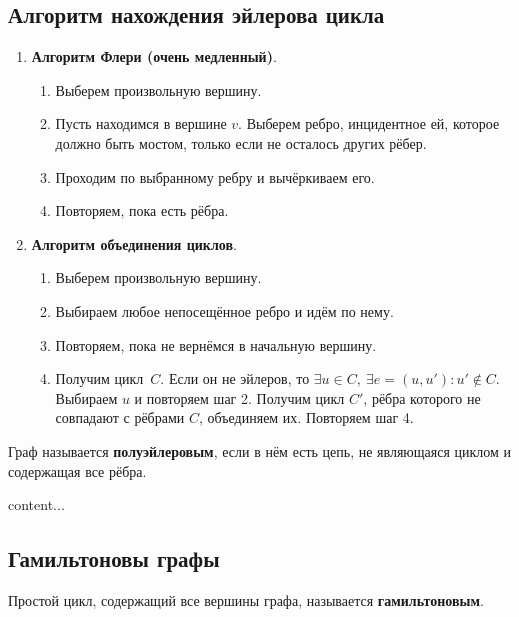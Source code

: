 \subsection{Алгоритм нахождения эйлерова цикла}
\begin{enumerate}
	\item \textbf{Алгоритм Флери (очень медленный)}.
	\begin{enumerate}
		\item Выберем произвольную вершину.
		\item Пусть находимся в вершине $v$. Выберем ребро, инцидентное ей, которое должно быть мостом, только если не осталось других рёбер.
		\item Проходим по выбранному ребру и вычёркиваем его.
		\item Повторяем, пока есть рёбра.
	\end{enumerate}
	\item \textbf{Алгоритм объединения циклов}.
	\begin{enumerate}
		\item Выберем произвольную вершину.
		\item Выбираем любое непосещённое ребро и идём по нему.
		\item Повторяем, пока не вернёмся в начальную вершину.
		\item Получим цикл~$C$. Если он не эйлеров, то $\exists u \in C, \ \exists e = (u, u') \colon u' \notin C$. Выбираем $u$ и повторяем шаг 2. Получим цикл $C'$, рёбра которого не совпадают с рёбрами $C$, объединяем их. Повторяем шаг 4.
	\end{enumerate}
\end{enumerate}

\begin{definition}
	Граф называется \textbf{полуэйлеровым}, если в нём есть цепь, не являющаяся циклом и содержащая все рёбра.
\end{definition}

\begin{theorem}
content...
\end{theorem}

\subsection{Гамильтоновы графы}
\begin{definition}
	Простой цикл, содержащий все вершины графа, называется \textbf{гамильтоновым}.
\end{definition}

